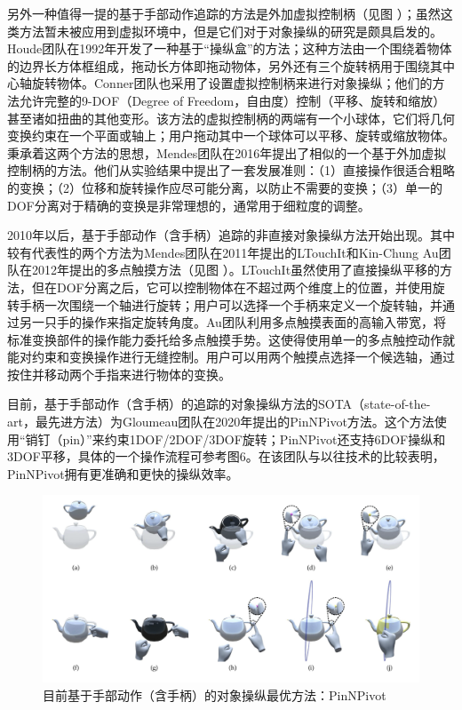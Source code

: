 另外一种值得一提的基于手部动作追踪的方法是外加虚拟控制柄（见图 ）；虽然这类方法暂未被应用到虚拟环境中，但是它们对于对象操纵的研究是颇具启发的。Houde团队在1992年开发了一种基于“操纵盒”的方法；这种方法由一个围绕着物体的边界长方体框组成，拖动长方体即拖动物体，另外还有三个旋转柄用于围绕其中心轴旋转物体。Conner团队也采用了设置虚拟控制柄来进行对象操纵；他们的方法允许完整的9-DOF（Degree of Freedom，自由度）控制（平移、旋转和缩放）甚至诸如扭曲的其他变形。该方法的虚拟控制柄的两端有一个小球体，它们将几何变换约束在一个平面或轴上；用户拖动其中一个球体可以平移、旋转或缩放物体。秉承着这两个方法的思想，Mendes团队在2016年提出了相似的一个基于外加虚拟控制柄的方法。他们从实验结果中提出了一套发展准则：（1）直接操作很适合粗略的变换；（2）位移和旋转操作应尽可能分离，以防止不需要的变换；（3）单一的DOF分离对于精确的变换是非常理想的，通常用于细粒度的调整。

2010年以后，基于手部动作（含手柄）追踪的非直接对象操纵方法开始出现。其中较有代表性的两个方法为Mendes团队在2011年提出的LTouchIt和Kin-Chung Au团队在2012年提出的多点触摸方法（见图 ）。LTouchIt虽然使用了直接操纵平移的方法，但在DOF分离之后，它可以控制物体在不超过两个维度上的位置，并使用旋转手柄一次围绕一个轴进行旋转；用户可以选择一个手柄来定义一个旋转轴，并通过另一只手的操作来指定旋转角度。Au团队利用多点触摸表面的高输入带宽，将标准变换部件的操作能力委托给多点触摸手势。这使得使用单一的多点触控动作就能对约束和变换操作进行无缝控制。用户可以用两个触摸点选择一个候选轴，通过按住并移动两个手指来进行物体的变换。

目前，基于手部动作（含手柄）的追踪的对象操纵方法的SOTA（state-of-the-art，最先进方法）为Gloumeau团队在2020年提出的PinNPivot方法。这个方法使用“销钉（pin）”来约束1DOF/2DOF/3DOF旋转；PinNPivot还支持6DOF操纵和3DOF平移，具体的一个操作流程可参考图6。在该团队与以往技术的比较表明，PinNPivot拥有更准确和更快的操纵效率。

\begin{figure}[t!]
    \centering
    \includegraphics[width=.99\textwidth]{figure/pinnpivot.png}
    \caption{目前基于手部动作（含手柄）的对象操纵最优方法：PinNPivot}
    \label{fig-5}
\end{figure}

